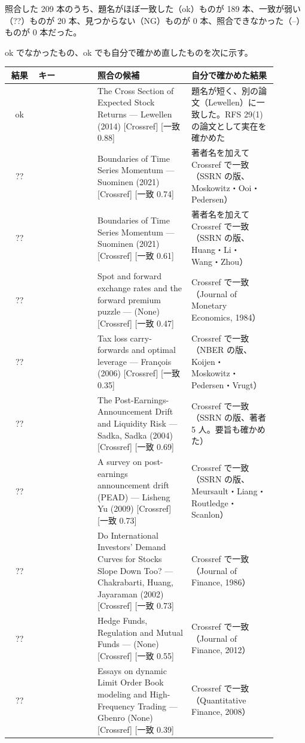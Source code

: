 照合した 209 本のうち、題名がほぼ一致した（ok）ものが 189 本、一致が弱い（??）ものが 20 本、見つからない（NG）ものが 0 本、照合できなかった（--）ものが 0 本だった。

ok でなかったもの、ok でも自分で確かめ直したものを次に示す。

{\footnotesize
\begin{longtable}{@{}cP{0.22\linewidth}P{0.35\linewidth}P{0.32\linewidth}@{}}
\toprule 結果 & キー & 照合の候補 & 自分で確かめた結果 \\ \midrule \endhead \bottomrule \endfoot
ok &  & The Cross Section of Expected Stock Returns — Lewellen (2014) [Crossref]  [一致 0.88] & 題名が短く、別の論文（Lewellen）に一致した。RFS 29(1) の論文として実在を確かめた \\
?? &  & Boundaries of Time Series Momentum — Suominen (2021) [Crossref]  [一致 0.74] & 著者名を加えて Crossref で一致（SSRN の版、Moskowitz・Ooi・Pedersen） \\
?? &  & Boundaries of Time Series Momentum — Suominen (2021) [Crossref]  [一致 0.61] & 著者名を加えて Crossref で一致（SSRN の版、Huang・Li・Wang・Zhou） \\
?? &  & Spot and forward exchange rates and the forward premium puzzle —  (None) [Crossref]  [一致 0.47] & Crossref で一致（Journal of Monetary Economics, 1984） \\
?? &  & Tax loss carry-forwards and optimal leverage — François (2006) [Crossref]  [一致 0.35] & Crossref で一致（NBER の版、Koijen・Moskowitz・Pedersen・Vrugt） \\
?? &  & The Post-Earnings-Announcement Drift and Liquidity Risk — Sadka, Sadka (2004) [Crossref]  [一致 0.69] & Crossref で一致（SSRN の版、著者 5 人。要旨も確かめた） \\
?? &  & A survey on post-earnings announcement drift (PEAD) — Lisheng Yu (2009) [Crossref]  [一致 0.73] & Crossref で一致（SSRN の版、Meursault・Liang・Routledge・Scanlon） \\
?? &  & Do International Investors' Demand Curves for Stocks Slope Down Too? — Chakrabarti, Huang, Jayaraman (2002) [Crossref]  [一致 0.73] & Crossref で一致（Journal of Finance, 1986） \\
?? &  & Hedge Funds, Regulation and Mutual Funds —  (None) [Crossref]  [一致 0.55] & Crossref で一致（Journal of Finance, 2012） \\
?? &  & Essays on dynamic Limit Order Book modeling and High-Frequency Trading — Gbenro (None) [Crossref]  [一致 0.39] & Crossref で一致（Quantitative Finance, 2008） \\

\end{longtable}}
